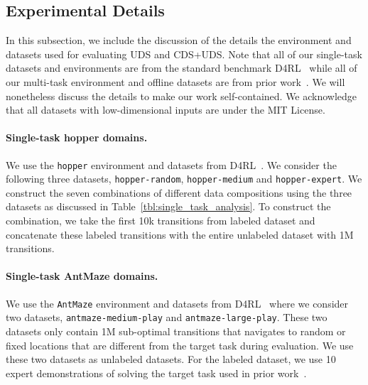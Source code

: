 \subsection{Experimental Details}
\label{app:uds_env_data_details}

In this subsection, we include the discussion of the details the environment and datasets used for evaluating UDS and CDS+UDS. Note that all of our single-task datasets and environments are from the standard benchmark D4RL~\citep{fu2020d4rl} while all of our multi-task environment and offline datasets are from prior work~\citep{yu2021conservative}. We will nonetheless discuss the details to make our work self-contained.  We acknowledge that all datasets with low-dimensional inputs are under the MIT License.

\paragraph{Single-task hopper domains.} We use the \texttt{hopper} environment and datasets from D4RL~\citep{fu2020d4rl}. We consider the following three datasets, \texttt{hopper-random}, \texttt{hopper-medium} and \texttt{hopper-expert}. We construct the seven combinations of different data compositions using the three datasets as discussed in Table~\ref{tbl:single_task_analysis}. To construct the combination, we take the first 10k transitions from labeled dataset and concatenate these labeled transitions with the entire unlabeled dataset with 1M transitions.

\paragraph{Single-task AntMaze domains.} We use the \texttt{AntMaze} environment and datasets from D4RL~\citep{fu2020d4rl} where we consider two datasets, \texttt{antmaze-medium-play} and \texttt{antmaze-large-play}. These two datasets only contain 1M sub-optimal transitions that navigates to random or fixed locations that are different from the target task during evaluation. We use these two datasets as unlabeled datasets. For the labeled dataset, we use 10 expert demonstrations of solving the target task used in prior work~\citep{yang2021trail}.

